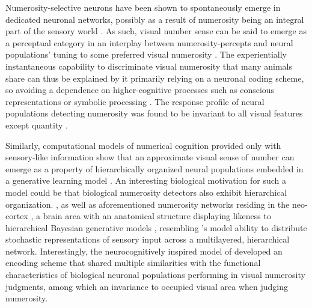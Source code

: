 \documentclass[twocolumn]{article}
\begin{document}
Numerosity-selective neurons have been shown to spontaneously emerge in dedicated neuronal networks, possibly as a result of numerosity being an integral part of the sensory world \citep{viswanathan2013neuronal}. As such, visual number sense can be said to emerge as a perceptual category in an interplay between numerosity-percepts and neural populations' tuning to some preferred visual numerosity \citep{nieder2016neuronal}. The experientially instantaneous capability to discriminate visual numerosity that many animals share \citep{nieder2016neuronal, animalsnumericalcognition} can thus be explained by it primarily relying on a neuronal coding scheme, so avoiding a dependence on higher-cognitive processes such as conscious representations \citep[p.~58 points to types of visual number sense being pre-attentive]{dehaene2011number} or symbolic processing \citep[visual numerosity percepts are understood non-verbally,][]{nieder2016neuronal}. The response profile of neural populations detecting numerosity was found to be invariant to all visual features except quantity \citep{nieder2016neuronal, harvey2013topographic}.

Similarly, computational models of numerical cognition provided only with sensory-like information  show that an approximate visual sense of number can emerge as a property of hierarchically organized neural populations embedded in a generative learning model \citep{stoianov2012}. An interesting biological motivation for such a model could be that biological numerosity detectors also exhibit hierarchical organization. \citep{nieder2016neuronal, viswanathan2013neuronal}, as well as aforementioned numerosity networks residing in the neo-cortex \citep{nieder2016neuronal}, a brain area with an anatomical structure displaying likeness to hierarchical Bayesian generative models
\citetext{\citealp{friston2003learning}; although the brain in general is sometimes characterized as a probabilistic modeler of it's sensory world, e.g. \citealp{bayesianbrain, griffiths2006optimal}}, resembling \citet{stoianov2012}'s model ability to distribute stochastic representations of sensory input across a multilayered, hierarchical network. Interestingly, the neurocognitively inspired model of \citet{stoianov2012} developed an encoding scheme that shared multiple similarities with the functional characteristics of biological neuronal populations performing in visual numerosity judgments, among which an invariance to occupied visual area when judging numerosity.
\end{document}
